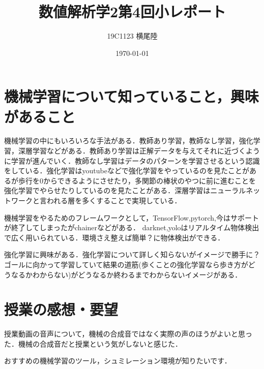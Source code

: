 \documentclass[dvipdfmx]{jsarticle}
\begin{document}
\title{数値解析学2第4回小レポート}
\author{19C1123 横尾陸}
\date{\today}
\maketitle

\section*{機械学習について知っていること，興味があること}
機械学習の中にもいろいろな手法がある．教師あり学習，教師なし学習，強化学習，深層学習などがある．教師あり学習は正解データを与えてそれに近づくように学習が進んでいく．教師なし学習はデータのパターンを学習させるという認識をしている．強化学習はyoutubeなどで強化学習をやっているのを見たことがあるが歩行を0からできるようにさせたり，多関節の棒状のやつに前に進むことを強化学習でやらせたりしているのを見たことがある．深層学習はニューラルネットワークと言われる層を多くすることで実現している．

機械学習をやるためのフレームワークとして，TensorFlow,pytorch,今はサポートが終了してしまったがchainerなどがある．
darknet,yoloはリアルタイム物体検出で広く用いられている．環境さえ整えば簡単？に物体検出ができる．

強化学習に興味がある．強化学習について詳しく知らないがイメージで勝手に？ゴールに向かって学習していて結果の道筋(歩くことの強化学習なら歩き方がどうなるかわからない)がどうなるか終わるまでわからないイメージがある．

\section*{授業の感想・要望}
授業動画の音声について，機械の合成音ではなく実際の声のほうがよいと思った．機械の合成音だと授業という気がしないと感じた．

おすすめの機械学習のツール，シュミレーション環境が知りたいです．
\end{document}
